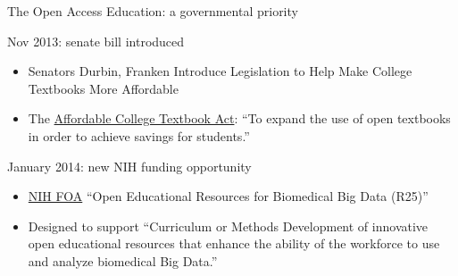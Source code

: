 \begin{frame}{The Open Access Education: a governmental priority}

\begin{block}{Nov 2013: senate bill introduced}
\begin{itemize}
\item Senators Durbin, Franken Introduce Legislation to Help Make College Textbooks More Affordable

\item The \href{http://thomas.loc.gov/cgi-bin/query/z?c113:S.1704:}{Affordable College Textbook Act}: ``To expand the use of open textbooks in order to achieve savings for students.''
\end{itemize}
\end{block}

\begin{block}{January 2014: new NIH funding opportunity}
\begin{itemize}
\item \href{http://grants.nih.gov/grants/guide/rfa-files/RFA-HG-14-009.html}{NIH FOA} ``Open Educational Resources for Biomedical Big Data (R25)''
\item Designed to support ``Curriculum or Methods Development of innovative open educational resources that enhance the ability of the workforce to use and analyze biomedical Big Data.''
\end{itemize}
\end{block}

\end{frame}




